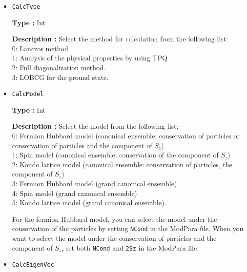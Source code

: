 \begin{itemize}
\item  \verb|CalcType|

{\bf Type :} Int 

{\bf Description :} Select the method for calculation from the following list:\\
0: Lanczos method\\
1: Analysis of the physical properties by using TPQ\\
2: Full diagonalization method.\\
3: LOBCG for the ground state.


\item  \verb|CalcModel|

{\bf Type :} Int 

{\bf Description :} Select the model from the following list:\\
0: Fermion Hubbard model (canonical ensemble: {conservation of particles or} conservation of particles and the component of $S_z$)\\
1: Spin model (canonical ensemble: conservation of the component of $S_z$)\\
2: Kondo lattice model (canonical ensemble: conservation of particles, the component of $S_z$)\\
3: Fermion Hubbard model (grand canonical ensemble)\\
4: Spin model (grand canonical ensemble)\\
5: Kondo lattice model (grand canonical ensemble).

For the fermion Hubbard model, you can select the model under the conservation of the particles by setting \verb|NCond| in the ModPara file. When you want to select the model under the conservation of particles and the component of $S_z$, set both \verb|NCond| and \verb|2Sz| {in the ModPara file}.
%
%

\item  \verb|CalcEigenVec|


\end{itemize}
